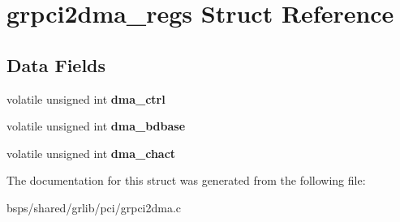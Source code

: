 \hypertarget{structgrpci2dma__regs}{}\section{grpci2dma\+\_\+regs Struct Reference}
\label{structgrpci2dma__regs}
\subsection*{Data Fields}
\begin{DoxyCompactItemize}
\item 
\mbox{\label{structgrpci2dma__regs_a8e573e9f05d87ac8366dbfb6c902aebd}} 
volatile unsigned int {\bfseries dma\+\_\+ctrl}
\item 
\mbox{\label{structgrpci2dma__regs_a904a011e182fc908df0c048637df5d76}} 
volatile unsigned int {\bfseries dma\+\_\+bdbase}
\item 
\mbox{\label{structgrpci2dma__regs_a0d94f1113e4b575bc5512dbe8dcd496d}} 
volatile unsigned int {\bfseries dma\+\_\+chact}
\end{DoxyCompactItemize}


The documentation for this struct was generated from the following file\+:\begin{DoxyCompactItemize}
\item 
bsps/shared/grlib/pci/grpci2dma.\+c\end{DoxyCompactItemize}

